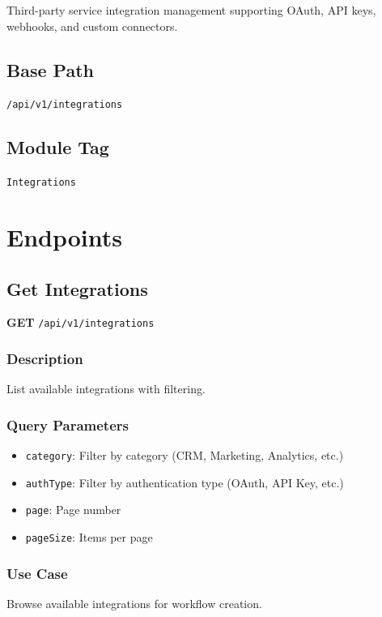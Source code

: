 \documentclass[11pt,a4paper]{report}
\begin{document}
Third-party service integration management supporting OAuth, API keys, webhooks, and custom connectors.

\subsection{Base Path}
\texttt{/api/v1/integrations}

\subsection{Module Tag}
\texttt{Integrations}

\section{Endpoints}

\subsection{Get Integrations}

\textbf{GET} \texttt{/api/v1/integrations}

\subsubsection{Description}
List available integrations with filtering.

\subsubsection{Query Parameters}
\begin{itemize}[leftmargin=*]
    \item \texttt{category}: Filter by category (CRM, Marketing, Analytics, etc.)
    \item \texttt{authType}: Filter by authentication type (OAuth, API Key, etc.)
    \item \texttt{page}: Page number
    \item \texttt{pageSize}: Items per page
\end{itemize}

\subsubsection{Use Case}
Browse available integrations for workflow creation.
\end{document}
